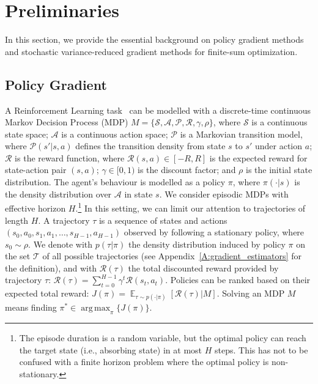 \documentclass{article}
\makeatletter
\theoremstyle{remark}
\theoremstyle{definition}
\DeclareRobustCommand{\ie}{i.e.,\@\xspace}
\DeclareMathOperator*{\argmax}{arg\,max}
\DeclareMathOperator*{\EV}{\mathbb{E}}
\newcommand{\EVV}[2][\ppvect \in \ppspace]{\EV_{#1}\left[{#2}\right]}
\newcommand{\Aspace}{\mathcal{A}}
\newcommand{\Sspace}{\mathcal{S}}
\newcommand{\Tspace}{\mathcal{T}}
\newcommand{\Transition}{\mathcal{P}}
\newcommand{\Reward}{\mathcal{R}}
\makeatother
\begin{document}
\section{Preliminaries}\label{sec:pre}
In this section, we provide the essential background on policy gradient methods and stochastic variance-reduced gradient methods for finite-sum optimization.

\subsection{Policy Gradient}\label{subsec:PolicyGradient}
A Reinforcement Learning task~\citep{sutton1998reinforcement} can be modelled with a discrete-time continuous Markov Decision Process (MDP) $M = \{\Sspace,\Aspace,\Transition,\Reward,\gamma,\rho\}$, where $\Sspace$ is a continuous state space; $\Aspace$ is a continuous action space; $\Transition$ is a Markovian transition model, where $\Transition(s'|s,a)$ defines the transition density from state $s$ to $s'$ under action $a$; $\Reward$ is the reward function, where $\Reward(s,a) \in [-R,R]$ is the expected reward for state-action pair $(s,a)$;
$\gamma\in[0,1)$ is the discount factor; and $\rho$ is the initial state distribution.
The agent's behaviour is modelled as a policy $\pi$, where $\pi(\cdot|s)$ is the density distribution over $\Aspace$ in state $s$.
We consider episodic MDPs with effective horizon $H$.\footnote{The episode duration is a random variable, but the optimal policy can reach the target state (\ie absorbing state) in at most $H$ steps. This has not to be confused with a finite horizon problem where the optimal policy is non-stationary.} In this setting, we can limit our attention to trajectories of length $H$. A trajectory $\tau$ is a sequence of states and actions $(s_0,a_0,s_1,a_1,\dots,s_{H-1},a_{H-1})$ observed by following a stationary policy, where $s_0 \sim \rho$.
We denote with $p(\tau|\pi)$ the density distribution induced by policy $\pi$ on the set $\Tspace$ of all possible trajectories (see Appendix~\ref{A:gradient_estimators} for the definition), and with $\Reward(\tau)$ the total discounted reward provided by trajectory $\tau$:
%
$\Reward(\tau) = \sum_{t=0}^{H-1}\gamma^t\Reward(s_t,a_t).$
%
Policies can be ranked based on their expected total reward: $J(\pi) = \EVV[\tau \sim p(\cdot|\pi)]{\Reward(\tau)|M}$.
Solving an MDP $M$ means finding $\pi^* \in \argmax_{\pi} \{J(\pi)\}$.
\end{document}
